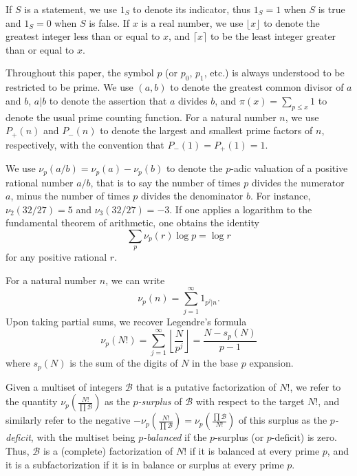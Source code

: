 \documentclass[12pt,a4paper,reqno]{amsart}
\numberwithin{equation}{section}
\theoremstyle{plain}
\theoremstyle{definition}
\newcommand\tuple{{\mathcal B}}
\begin{document}
If $S$ is a statement, we use $1_S$ to denote its indicator, thus $1_S=1$ when $S$ is true and $1_S=0$ when $S$ is false.  If $x$ is a real number, we use $\lfloor x \rfloor$ to denote the greatest integer less than or equal to $x$, and $\lceil x \rceil$ to be the least integer greater than or equal to $x$.

Throughout this paper, the symbol $p$ (or $p_0$, $p_1$, etc.) is always understood to be restricted to be prime.  
We use $(a,b)$ to denote the greatest common divisor of $a$ and $b$, $a|b$ to denote the assertion that $a$ divides $b$, and $\pi(x) = \sum_{p \leq x} 1$ to denote the usual prime counting function.  For a natural number $n$, we use $P_+(n)$ and $P_-(n)$ to denote the largest and smallest prime factors of $n$, respectively, with the convention that $P_-(1) = P_+(1) = 1$. 

We use $\nu_p(a/b) = \nu_p(a)-\nu_p(b)$ to denote the $p$-adic valuation of a positive rational number $a/b$, that is to say the number of times $p$ divides the numerator $a$, minus the number of times $p$ divides the denominator $b$.  For instance, $\nu_2(32/27)=5$ and $\nu_3(32/27)=-3$.
If one applies a logarithm to the fundamental theorem of arithmetic, one obtains the identity
\begin{equation}\label{ftoa}
  \sum_p \nu_p(r) \log p = \log r
\end{equation}
for any positive rational $r$.  

For a natural number $n$, we can write
\begin{equation}\label{nup-form} 
  \nu_p(n) = \sum_{j=1}^\infty 1_{p^j|n}.
\end{equation}
Upon taking partial sums, we recover Legendre's formula
\begin{equation}\label{legendre}
  \nu_p(N!) = \sum_{j=1}^\infty \left\lfloor \frac{N}{p^j} \right\rfloor = \frac{N - s_p(N)}{p-1}
\end{equation}
where $s_p(N)$ is the sum of the digits of $N$ in the base $p$ expansion.

Given a multiset of integers $\tuple$ that is a putative factorization of $N!$,  
we refer to the quantity $\nu_p\left( \frac{N!}{\prod \tuple} \right)$ as the \emph{$p$-surplus} of $\tuple$ with respect to the target $N!$, and similarly refer to the negative $-\nu_p\left( \frac{N!}{\prod \tuple} \right) = \nu_p\left( \frac{\prod \tuple}{N!} \right)$ of this surplus as the \emph{$p$-deficit}, with the multiset being \emph{$p$-balanced} if the $p$-surplus (or $p$-deficit) is zero.  Thus, $\tuple$ is a (complete) factorization of $N!$ if it is balanced at every prime $p$, and it is a subfactorization if it is in balance or surplus at every prime $p$.
\end{document}
